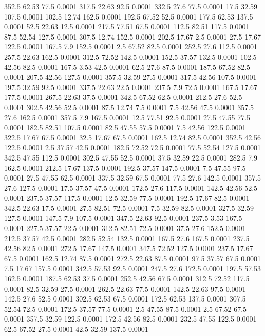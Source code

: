 352.5	62.53	77.5	0.0001
317.5	22.63	92.5	0.0001
332.5	27.6	77.5	0.0001
17.5	32.59	107.5	0.0001
102.5	12.74	162.5	0.0001
192.5	67.52	52.5	0.0001
177.5	62.53	137.5	0.0001
52.5	22.63	12.5	0.0001
217.5	77.51	67.5	0.0001
112.5	82.51	117.5	0.0001
87.5	52.54	127.5	0.0001
307.5	12.74	152.5	0.0001
202.5	17.67	2.5	0.0001
27.5	17.67	122.5	0.0001
167.5	7.9	152.5	0.0001
2.5	67.52	82.5	0.0001
252.5	27.6	112.5	0.0001
257.5	22.63	162.5	0.0001
312.5	72.52	142.5	0.0001
152.5	37.57	132.5	0.0001
102.5	42.56	82.5	0.0001
167.5	3.53	42.5	0.0001
62.5	27.6	87.5	0.0001
187.5	67.52	82.5	0.0001
207.5	42.56	127.5	0.0001
357.5	32.59	27.5	0.0001
317.5	42.56	107.5	0.0001
197.5	32.59	92.5	0.0001
337.5	22.63	22.5	0.0001
237.5	7.9	72.5	0.0001
167.5	17.67	177.5	0.0001
267.5	22.63	37.5	0.0001
342.5	67.52	62.5	0.0001
212.5	27.6	52.5	0.0001
302.5	42.56	52.5	0.0001
87.5	12.74	7.5	0.0001
7.5	42.56	47.5	0.0001
357.5	27.6	162.5	0.0001
357.5	7.9	167.5	0.0001
12.5	77.51	92.5	0.0001
27.5	47.55	77.5	0.0001
182.5	82.51	107.5	0.0001
82.5	47.55	57.5	0.0001
7.5	42.56	122.5	0.0001
322.5	17.67	67.5	0.0001
32.5	17.67	67.5	0.0001
162.5	12.74	82.5	0.0001
352.5	42.56	122.5	0.0001
2.5	37.57	42.5	0.0001
182.5	72.52	72.5	0.0001
77.5	52.54	127.5	0.0001
342.5	47.55	112.5	0.0001
302.5	47.55	52.5	0.0001
37.5	32.59	22.5	0.0001
282.5	7.9	162.5	0.0001
212.5	17.67	137.5	0.0001
192.5	37.57	147.5	0.0001
7.5	47.55	97.5	0.0001
27.5	47.55	62.5	0.0001
337.5	32.59	67.5	0.0001
77.5	27.6	142.5	0.0001
357.5	27.6	127.5	0.0001
17.5	37.57	47.5	0.0001
172.5	27.6	117.5	0.0001
142.5	42.56	52.5	0.0001
237.5	37.57	117.5	0.0001
12.5	32.59	77.5	0.0001
192.5	17.67	82.5	0.0001
342.5	22.63	17.5	0.0001
27.5	82.51	72.5	0.0001
7.5	32.59	82.5	0.0001
327.5	32.59	127.5	0.0001
147.5	7.9	107.5	0.0001
347.5	22.63	92.5	0.0001
237.5	3.53	167.5	0.0001
227.5	37.57	22.5	0.0001
312.5	82.51	72.5	0.0001
37.5	27.6	152.5	0.0001
212.5	37.57	42.5	0.0001
282.5	52.54	132.5	0.0001
167.5	27.6	167.5	0.0001
237.5	42.56	82.5	0.0001
272.5	17.67	147.5	0.0001
347.5	72.52	127.5	0.0001
237.5	17.67	67.5	0.0001
162.5	12.74	87.5	0.0001
272.5	22.63	87.5	0.0001
97.5	37.57	67.5	0.0001
7.5	17.67	157.5	0.0001
342.5	57.53	92.5	0.0001
247.5	27.6	172.5	0.0001
197.5	57.53	162.5	0.0001
187.5	62.53	37.5	0.0001
252.5	42.56	67.5	0.0001
312.5	72.52	117.5	0.0001
82.5	32.59	27.5	0.0001
262.5	22.63	77.5	0.0001
142.5	22.63	97.5	0.0001
142.5	27.6	52.5	0.0001
302.5	62.53	67.5	0.0001
172.5	62.53	137.5	0.0001
307.5	52.54	72.5	0.0001
172.5	37.57	77.5	0.0001
2.5	47.55	87.5	0.0001
2.5	67.52	67.5	0.0001
357.5	32.59	122.5	0.0001
172.5	42.56	82.5	0.0001
232.5	47.55	122.5	0.0001
62.5	67.52	27.5	0.0001
42.5	32.59	137.5	0.0001
